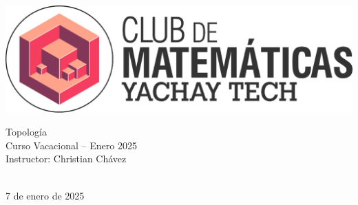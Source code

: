 




    




\begin{center}
\begin{minipage}{0.45\textwidth}
    \includegraphics[height=0.075\textheight]{images/LogoClubMate.pdf}
\end{minipage}%
\hfill
\begin{minipage}{0.5\textwidth}
    \begin{flushright}
        {\LARGE Topología} \\ Curso Vacacional -- Enero 2025 \\
        Instructor: Christian Chávez \\
    \end{flushright}
\end{minipage}

\vspace{\baselineskip}
{\huge\thetitle} \\

7 de enero de 2025

\end{center}
